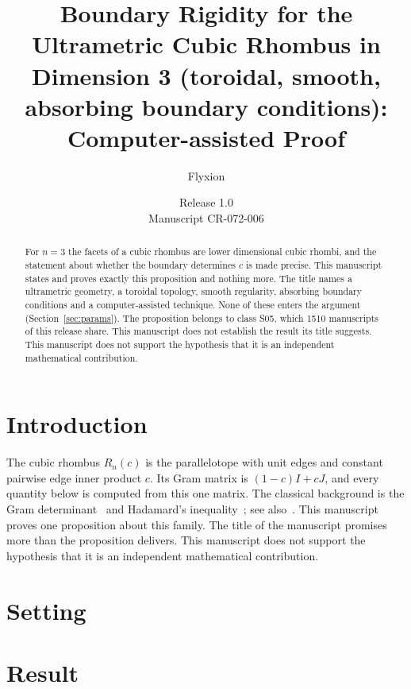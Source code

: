 \documentclass[11pt]{article}
\title{Boundary Rigidity for the Ultrametric Cubic Rhombus in Dimension 3 (toroidal, smooth, absorbing boundary conditions): Computer-assisted Proof}
\author{Flyxion}
\date{Release 1.0\\ Manuscript CR-072-006}
\begin{document}
\maketitle
\begin{abstract}
For $n=3$ the facets of a cubic rhombus are lower dimensional cubic rhombi, and the statement about whether the boundary determines $c$ is made precise. This manuscript states and proves exactly this proposition and nothing more. The title names a ultrametric geometry, a toroidal topology, smooth regularity, absorbing boundary conditions and a computer-assisted technique. None of these enters the argument (Section~\ref{sec:params}). The proposition belongs to class S05, which 1510 manuscripts of this release share. This manuscript does not establish the result its title suggests. This manuscript does not support the hypothesis that it is an independent mathematical contribution.
\end{abstract}

\section{Introduction}
The cubic rhombus $R_n(c)$ is the parallelotope with unit edges and constant pairwise edge inner product $c$. Its Gram matrix is $(1-c)I+cJ$, and every quantity below is computed from this one matrix. The classical background is the Gram determinant~\cite{gram} and Hadamard's inequality~\cite{hadamard}; see also~\cite{hj}.
This manuscript proves one proposition about this family. The title of the manuscript promises more than the proposition delivers. This manuscript does not support the hypothesis that it is an independent mathematical contribution.

\section{Setting}


\section{Result}

\end{document}
